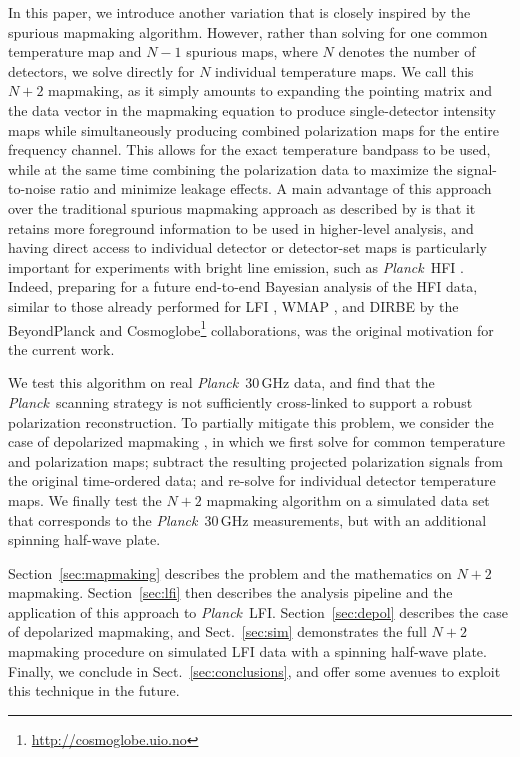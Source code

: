 \documentclass{aa}
\def\Planck{\textit{Planck}}
\begin{document}
In this paper, we introduce another variation that is closely inspired by the spurious mapmaking algorithm. However, rather than solving for one common temperature map and $N-1$ spurious maps, where $N$ denotes the number of detectors, we solve directly for $N$ individual temperature maps. We call this $N+2$ mapmaking, as it simply amounts to expanding the pointing matrix and the data vector in the mapmaking equation to produce single-detector intensity maps while simultaneously producing combined polarization maps for the entire frequency channel. This allows for the exact temperature bandpass to be used, while at the same time combining the polarization data to maximize the signal-to-noise ratio and minimize leakage effects. A main advantage of this approach over the traditional spurious mapmaking approach as described by \citet{spurious} is that it retains more foreground information to be used in higher-level analysis, and having direct access to individual detector or detector-set maps is particularly important for experiments with bright line emission, such as \Planck\ HFI \citep{planck_co:2014}. Indeed, preparing for a future end-to-end Bayesian analysis of the HFI data, similar to those already performed for LFI \citep{bp01}, WMAP \citep{watts2023_dr1}, and DIRBE \citep{CG02_01} by the BeyondPlanck and Cosmoglobe\footnote{\url{http://cosmoglobe.uio.no}} collaborations, was the original motivation for the current work.  

We test this algorithm on real \Planck\ 30\,GHz data, and find that the \Planck\ scanning strategy is not sufficiently cross-linked to support a robust polarization reconstruction. To partially mitigate this problem, we consider the case of depolarized mapmaking \citep[e.g.,][]{npipe}, in which we first solve for common temperature and polarization maps; subtract the resulting projected polarization signals from the original time-ordered data; and re-solve for individual detector temperature maps. We finally test the $N+2$ mapmaking algorithm on a simulated data set that corresponds to the \Planck\ 30\,GHz measurements, but with an additional spinning half-wave plate.  

Section~\ref{sec:mapmaking} describes the problem and the mathematics on $N+2$ mapmaking. Section~\ref{sec:lfi} then describes the analysis pipeline and the application of this approach to \Planck\ LFI. Section~\ref{sec:depol} describes the case of depolarized mapmaking, and Sect.~\ref{sec:sim} demonstrates the full $N+2$ mapmaking procedure on simulated LFI data with a spinning half-wave plate. Finally, we conclude in Sect.~\ref{sec:conclusions}, and offer some avenues to exploit this technique in the future.
\end{document}
